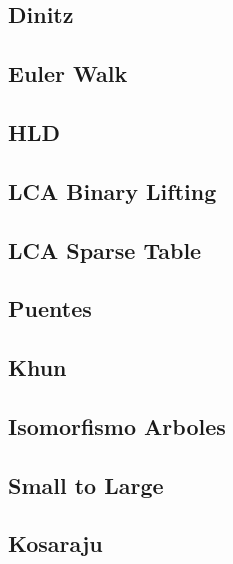\subsection{   Dinitz}
\raggedbottom
\hrulefill
\subsection{   Euler Walk}
\raggedbottom
\hrulefill
\subsection{   HLD}
\raggedbottom
\hrulefill
\subsection{   LCA Binary Lifting}
\raggedbottom
\hrulefill
\subsection{   LCA Sparse Table}
\raggedbottom
\hrulefill
\subsection{   Puentes}
\raggedbottom
\hrulefill
\subsection{   Khun}
\raggedbottom
\hrulefill
\subsection{   Isomorfismo Arboles}
\raggedbottom
\hrulefill
\subsection{   Small to Large}
\raggedbottom
\hrulefill
\subsection{   Kosaraju}
\raggedbottom
\hrulefill
